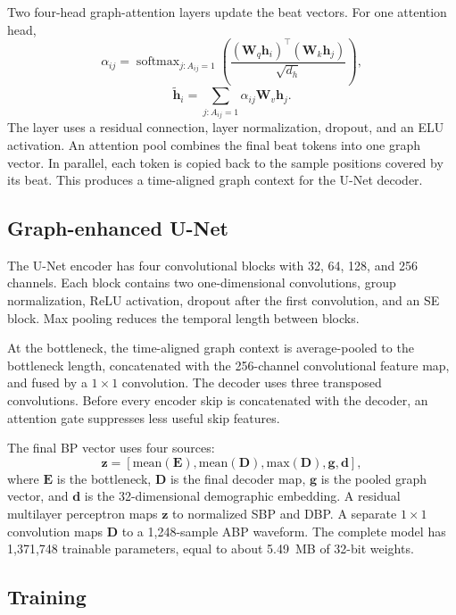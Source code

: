 \documentclass[journal,twoside,web]{ieeecolor}
\begin{document}
Two four-head graph-attention layers update the beat vectors. For one attention head,
\begin{equation}
\alpha_{ij}=\mathop{\mathrm{softmax}}_{j:A_{ij}=1}
\left(\frac{(\mathbf{W}_q\mathbf{h}_i)^\top(\mathbf{W}_k\mathbf{h}_j)}{\sqrt{d_h}}\right),
\end{equation}
\begin{equation}
\widetilde{\mathbf{h}}_i=\sum_{j:A_{ij}=1}\alpha_{ij}\mathbf{W}_v\mathbf{h}_j.
\end{equation}
The layer uses a residual connection, layer normalization, dropout, and an ELU activation. An attention pool combines the final beat tokens into one graph vector. In parallel, each token is copied back to the sample positions covered by its beat. This produces a time-aligned graph context for the U-Net decoder.

\subsection{Graph-enhanced U-Net}

The U-Net encoder has four convolutional blocks with 32, 64, 128, and 256 channels. Each block contains two one-dimensional convolutions, group normalization, ReLU activation, dropout after the first convolution, and an SE block. Max pooling reduces the temporal length between blocks.

At the bottleneck, the time-aligned graph context is average-pooled to the bottleneck length, concatenated with the 256-channel convolutional feature map, and fused by a $1\times1$ convolution. The decoder uses three transposed convolutions. Before every encoder skip is concatenated with the decoder, an attention gate suppresses less useful skip features.

The final BP vector uses four sources:
\begin{equation}
\mathbf{z}=[\mathrm{mean}(\mathbf{E}),\mathrm{mean}(\mathbf{D}),
\mathrm{max}(\mathbf{D}),\mathbf{g},\mathbf{d}],
\end{equation}
where $\mathbf{E}$ is the bottleneck, $\mathbf{D}$ is the final decoder map, $\mathbf{g}$ is the pooled graph vector, and $\mathbf{d}$ is the 32-dimensional demographic embedding. A residual multilayer perceptron maps $\mathbf{z}$ to normalized SBP and DBP. A separate $1\times1$ convolution maps $\mathbf{D}$ to a 1,248-sample ABP waveform. The complete model has 1,371,748 trainable parameters, equal to about 5.49~MB of 32-bit weights.

\subsection{Training}
\end{document}
